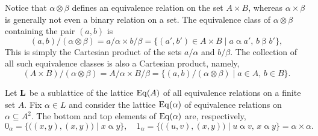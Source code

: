 Notice that $\alpha \otimes \beta$ defines an equivalence relation on the set
$A\times B$, whereas $\alpha\times \beta$ is generally
not even a binary relation on a set.
The equivalence class of $\alpha \otimes \beta$ containing the pair
$(a, b)$ is %
  \[(a,b)/(\alpha \otimes \beta) = a/\alpha \times b/\beta= 
    \{(a', b') \in A\times B \mid a\mathrel{\alpha} a', \, b\mathrel{\beta} b'\},
    \]
This is simply the Cartesian product of the sets $a/\alpha$ and $b/\beta$.
The collection of all such equivalence classes is also a Cartesian product, namely,
\[
(A\times B)/(\alpha \otimes \beta) =
A/\alpha \times B/\beta  = \{(a, b)/(\alpha \otimes \beta) \mid a\in A,\,b \in B\}.\]

\bigskip


Let $\mathbf{L}$ be a sublattice of the lattice $\operatorname{Eq}(A)$ of all
equivalence relations on a finite set $A$.  Fix $\alpha \in L$ and consider 
the lattice $\operatorname{Eq}(\alpha)$ of equivalence relations on
$\alpha\subseteq A^2$.  The bottom and top elements of $\operatorname{Eq}(\alpha)$
are, respectively, 
\[
0_\alpha = \{\bigl((x, y), (x, y)\bigr) \mid x \mathrel{\alpha} y \},
\quad
1_\alpha = \{\bigl((u, v), (x, y)\bigr) \mid u \mathrel{\alpha} v, \, 
x \mathrel{\alpha} y \} = \alpha \times \alpha.
\]

